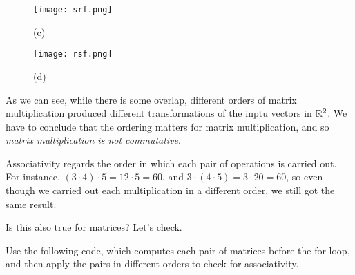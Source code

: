 \documentclass{ximera}
\begin{document}
\begin{exploration}
\begin{example}
\begin{selectAll}
        \end{selectAll}

        \begin{figure}[ht!]
            \centering
            \texttt{[image: srf.png]}
            \caption{(c)}
        \end{figure}

        \begin{selectAll}


        \end{selectAll}

        \begin{figure}[ht!]
            \centering
            \texttt{[image: rsf.png]}
            \caption{(d)}
        \end{figure}

        \begin{selectAll}


        \end{selectAll}

    As we can see, while there is some overlap, different orders of matrix multiplication produced different transformations of the inptu vectors in $\mathbb{R}^2$. We have to conclude that the ordering matters for matrix multiplication, and so \emph{matrix multiplication is not commutative}.

    \end{example}

    \begin{example}

        Associativity regards the order in which each pair of operations is carried out. For instance, $(3\cdot 4)\cdot 5=12\cdot 5=60$, and $3\cdot (4\cdot 5)=3\cdot 20=60$, so even though we carried out each multiplication in a different order, we still got the same result.

        Is this also true for matrices? Let's check.

        Use the following code, which computes each pair of matrices before the for loop, and then apply the pairs in different orders to check for associativity.


\end{example}
\end{exploration}
\end{document}
